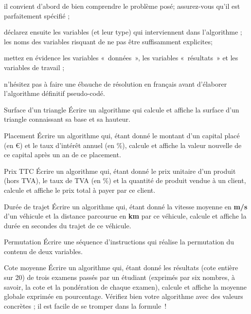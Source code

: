 	\begin{liste}
	\item {
		il convient d’abord de bien comprendre le problème posé; assurez-vous
		qu’il est parfaitement spécifié ;}
	\item {
		déclarez ensuite les variables (et leur type) qui interviennent dans
		l’algorithme ; les noms des variables risquant de ne pas être
		suffisamment explicites;}
	\item {
		mettez en évidence les variables «~données~», les variables
		«~résultats~» et les variables de travail ;}
	\item {
		n’hésitez pas à faire une ébauche de résolution en français avant
		d’élaborer l’algorithme définitif pseudo-codé.}
	\end{liste}

\begin{Exercice}{Surface d’un triangle}
	Écrire un algorithme qui calcule et affiche la surface
	d’un triangle connaissant sa base et sa hauteur.
\end{Exercice}

\begin{Exercice}{Placement}
	Écrire un algorithme qui, étant donné le montant d’un capital placé 
	(en \euro) 
	et le taux d’intérêt annuel (en \%), calcule et affiche la valeur
	nouvelle de ce capital après un an de ce placement.
\end{Exercice}

\begin{Exercice}{Prix TTC}
	Écrire un algorithme qui, étant donné le prix unitaire d’un produit
	(hors TVA), le taux de TVA (en \%) et la quantité de produit vendue à
	un client, calcule et affiche le prix total à payer par ce client.
\end{Exercice}

\begin{Exercice}{Durée de trajet}
	Écrire un algorithme qui, étant donné la vitesse moyenne en \textbf{m/s}
	d’un véhicule et la distance parcourue en \textbf{km} par ce véhicule,
	calcule et affiche la durée en secondes du trajet de ce véhicule.
\end{Exercice}

\begin{Exercice}{Permutation}
	Écrire une séquence d’instructions qui réalise la permutation du contenu
	de deux variables.
\end{Exercice}

\begin{Exercice}{Cote moyenne}
	Écrire un algorithme qui, étant donné les résultats (cote entière sur
	20) de trois examens passés par un étudiant (exprimés par six nombres,
	à savoir, la cote et la pondération de chaque examen), calcule et
	affiche la moyenne globale exprimée en pourcentage. Vérifiez bien votre
	algorithme avec des valeurs concrètes ; il est facile de se tromper dans
	la formule~!
\end{Exercice}

